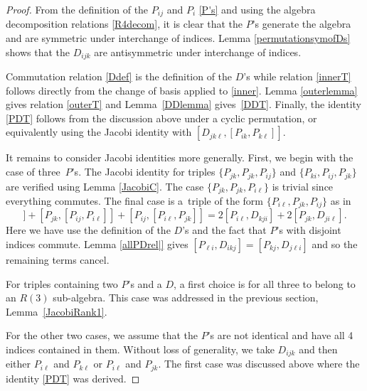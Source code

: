 \documentclass[pdftex]{sigma}
\numberwithin{equation}{section}
\begin{document}
\begin{proof}
 From the definition of the $P_{ij}$ and $P_{i}$ \eqref{P's} and using the algebra decomposition relations \eqref{R4decom}, it is clear that the $P$'s generate the algebra and are symmetric under interchange of indices. Lemma \ref{permutationsymofDs} shows that the $D_{ijk}$ are antisymmetric under interchange of indices.

Commutation relation \eqref{Ddef} is the definition of the $D$'s while relation \eqref{innerT} follows directly from the change of basis applied to \eqref{inner}. Lemma \ref{outerlemma} gives relation \eqref{outerT} and Lemma~\ref{DDlemma} gives~\eqref{DDT}. Finally, the identity \eqref{PDT} follows from the discussion above under a cyclic permutation, or equivalently using the Jacobi identity with $[D_{jk\ell}, [P_{ik}, P_{k\ell}]]$.

It remains to consider Jacobi identities more generally. First, we begin with the case of three~$P$'s. The Jacobi identity for triples $\{P_{jk},P_{jk},P_{ij}\} $ and $\{ P_{ki}, P_{ij}, P_{jk}\}$ are verified using Lemma \ref{JacobiC}. The case $\{P_{jk},P_{jk},P_{i\ell}\}$ is trivial since everything commutes. The final case is a~triple of the form $\{P_{i\ell},P_{jk},P_{ij}\}$ as in
\begin{equation*}
[ P_{i\ell},[P_{jk},P_{ij}]] + [P_{jk}, [ P_{ij}, P_{i\ell}]] + [P_{ij}, [P_{i\ell}, P_{jk}]]= 2[P_{i\ell}, D_{kji}]+2[P_{jk}, D_{ji\ell}].
\end{equation*}
Here we have use the definition of the $D$'s and the fact that $P$'s with disjoint indices commute. Lemma \ref{allPDrel|} gives
$ [P_{\ell i }, D_{i kj}]= [P_{kj}, D_{j \ell i}]$
and so the remaining terms cancel.

For triples containing two $P$'s and a $D$, a first choice is for all three to belong to an $R(3)$ sub-algebra. This case was addressed in the previous section, Lemma~\ref{JacobiRank1}.

For the other two cases, we assume that the $P$'s are not identical and have all 4 indices contained in them. Without loss of generality, we take $D_{ijk}$ and then either $P_{i\ell}$ and $P_{k \ell}$ or $P_{i \ell}$ and $P_{jk}$. The first case was discussed above where the identity \eqref{PDT} was derived.



\end{proof}
\end{document}
